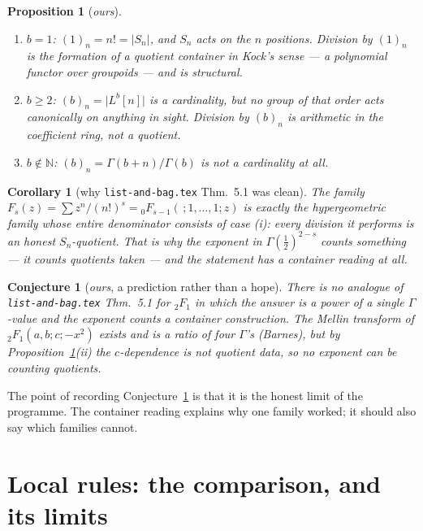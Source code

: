 \documentclass[11pt,a4paper]{article}
\newtheorem{proposition}[theorem]{Proposition}
\newtheorem{corollary}[theorem]{Corollary}
\newtheorem{conjecture}[theorem]{Conjecture}
\theoremstyle{definition}
\theoremstyle{remark}
\newcommand{\NN}{\mathbb{N}}
\newcommand{\norm}[1]{\lvert #1 \rvert}
\begin{document}
\begin{proposition}[\emph{ours}]\label{prop:downstairs}
\begin{enumerate}[nosep,label=(\roman*)]
  \item $b = 1$: $(1)_n = n! = \norm{S_n}$, and $S_n$ acts on the $n$ positions.
        Division by $(1)_n$ is the formation of a quotient container in Kock's sense
        \cite{Kock} --- a polynomial functor over groupoids --- and is structural.
  \item $b \ge 2$: $(b)_n = \norm{L^b[n]}$ is a cardinality, but no group of that
        order acts canonically on anything in sight. Division by $(b)_n$ is
        arithmetic in the coefficient ring, not a quotient.
  \item $b \notin \NN$: $(b)_n = \Gamma(b+n)/\Gamma(b)$ is not a cardinality at all.
\end{enumerate}
\end{proposition}

\begin{corollary}[why \texttt{list-and-bag.tex} Thm.~5.1 was clean]\label{cor:whyclean}
The family $F_s(z) = \sum z^n/(n!)^s = {}_0F_{s-1}(\,;1,\dots,1;z)$ is exactly the
hypergeometric family whose \emph{entire} denominator consists of case (i): every
division it performs is an honest $S_n$-quotient. That is why the exponent in
$\Gamma(\tfrac12)^{2-s}$ counts something --- it counts quotients taken --- and the
statement has a container reading at all.
\end{corollary}

\begin{conjecture}[\emph{ours}, a prediction rather than a hope]\label{conj:no2F1}
There is no analogue of \texttt{list-and-bag.tex} Thm.~5.1 for ${}_2F_1$ in which the
answer is a power of a single $\Gamma$-value and the exponent counts a container
construction. The Mellin transform of ${}_2F_1(a,b;c;-x^2)$ exists and is a ratio of
four $\Gamma$'s (Barnes), but by Proposition~\ref{prop:downstairs}(ii) the
$c$-dependence is not quotient data, so no exponent can be counting quotients.
\end{conjecture}

The point of recording Conjecture~\ref{conj:no2F1} is that it is the honest limit of
the programme. The container reading explains why one family worked; it should also
say which families cannot.

\section{Local rules: the comparison, and its limits}
\end{document}
